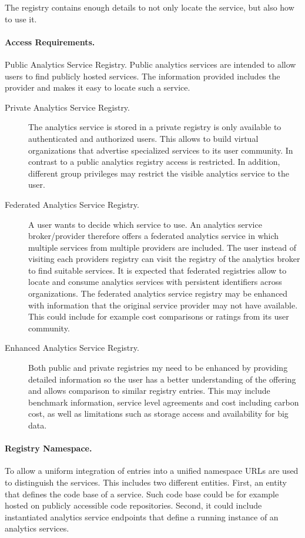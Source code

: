 \documentclass[12pt]{article}
\begin{document}
The registry contains enough details to not only locate the service, but also how to use it.

\paragraph{Access Requirements.} Public Analytics Service Registry. Public analytics services are intended to allow users to find publicly hosted services. The information provided includes the provider and makes it easy to locate such a service.

\begin{description}

\item[Private Analytics Service Registry.] The analytics service is stored in a private registry is only available to authenticated and authorized users. This allows to build virtual organizations that advertise specialized services to its user community. In contrast to a public analytics registry access is restricted. In addition, different group privileges may restrict the visible analytics service to the user.

\item[Federated Analytics Service Registry.] A user wants to decide which service to use. An analytics service broker/provider therefore offers a federated analytics service in which multiple services from multiple providers are included. The user instead of visiting each providers registry can visit the registry of the analytics broker to find suitable services. It is expected that federated registries allow to  locate and consume analytics services with persistent identifiers across organizations.  The federated analytics service registry may be enhanced with information that the original service provider may not have available. This could include for example cost comparisons or ratings from its user community.

\item[Enhanced Analytics Service Registry.] Both public and private registries my need to be enhanced by providing detailed information so the user has a better understanding of the offering and allows comparison to similar registry entries. This may include benchmark information, service level agreements and cost including carbon cost, as well as limitations such as storage access and availability for big data.
\end{description}

\paragraph{Registry Namespace.} To allow a uniform integration of entries into a unified namespace URLs are used to distinguish the services. This includes two different entities. First, an entity that defines the code base of a service. Such code base could be for example hosted on publicly accessible code repositories. Second, it could include instantiated analytics service endpoints that define a running instance of an analytics services.
\end{document}
